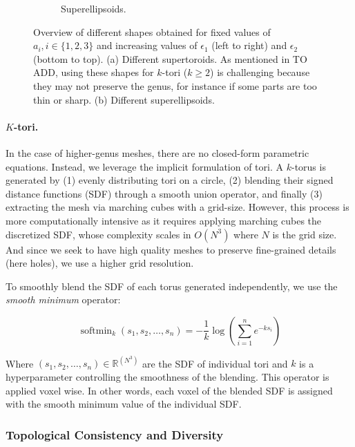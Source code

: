 \begin{figure}[t]
\begin{subfigure}[t]{0.48\linewidth}
    \caption{Superellipsoids.}
    \label{fig:ellipsoids-overview}
  \end{subfigure}
  \caption{Overview of different shapes obtained for fixed values of $a_i, i \in \{1, 2, 3\}$ and increasing values of $\epsilon_1$ (left to right) and $\epsilon_2$ (bottom to top). 
  (a) Different supertoroids. As mentioned in TO ADD, using these shapes for $k$-tori ($k \geq 2$) is challenging because they may not preserve the genus, for instance if some parts are too thin or sharp. 
  (b) Different superellipsoids.}
  \label{fig:overview}
\end{figure}

\paragraph{$K$-tori.} In the case of higher-genus meshes, there are no closed-form parametric equations. Instead, we leverage the implicit formulation of tori. A $k$-torus is generated by (1) evenly distributing tori on a circle, (2) blending their signed distance functions (SDF) through a smooth union operator, and finally (3) extracting the mesh via marching cubes with a grid-size. However, this process is more computationally intensive as it requires applying marching cubes the discretized SDF, whose complexity scales in $O(N^3)$ where $N$ is the grid size. And since we seek to have high quality meshes to preserve fine-grained details (here holes), we use a higher grid resolution.

To smoothly blend the SDF of each torus generated independently, we use the \textit{smooth minimum} operator:

\begin{equation}
\operatorname{softmin}_k(s_1, s_2, \dots, s_n) 
= -\frac{1}{k} \log \left( \sum_{i=1}^n e^{-k s_i} \right)
\end{equation}

Where $(s_1, s_2, \dots, s_n) \in \mathbb{R}^{(N^3)}$ are the SDF of individual tori and $k$ is a hyperparameter controlling the smoothness of the blending. This operator is applied voxel wise. In other words, each voxel of the blended SDF is assigned with the smooth minimum value of the individual SDF.

\subsubsection{Topological Consistency and Diversity}
\label{sssec:top-consistency}

